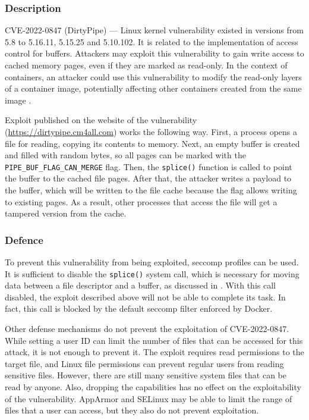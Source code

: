 \subsubsection*{Description}

CVE-2022-0847 (DirtyPipe) — Linux kernel vulnerability existed in versions from 5.8 to 5.16.11, 5.15.25 and 5.10.102. It is related to the implementation of access control for buffers. Attackers may exploit this vulnerability to gain write access to cached memory pages, even if they are marked as read-only. In the context of containers, an attacker could use this vulnerability to modify the read-only layers of a container image, potentially affecting other containers created from the same image \cite{s:h:2}.

Exploit published on the website of the vulnerability (\url{https://dirtypipe.cm4all.com}) works the following way. First, a process opens a file for reading, copying its contents to memory. Next, an empty buffer is created and filled with random bytes, so all pages can be marked with the \texttt{PIPE\_BUF\_FLAG\_CAN\_MERGE} flag. Then, the \texttt{splice()} function is called to point the buffer to the cached file pages. After that, the attacker writes a payload to the buffer, which will be written to the file cache because the flag allows writing to existing pages. As a result, other processes that access the file will get a tampered version from the cache. 

\subsubsection*{Defence}

To prevent this vulnerability from being exploited, seccomp profiles can be used. It is sufficient to disable the \texttt{splice()} system call, which is necessary for moving data between a file descriptor and a buffer, as discussed in \cite{s:h:4}. With this call disabled, the exploit described above will not be able to complete its task. In fact, this call is blocked by the default seccomp filter enforced by Docker.

Other defense mechanisms do not prevent the exploitation of CVE-2022-0847. While setting a user ID can limit the number of files that can be accessed for this attack, it is not enough to prevent it. The exploit requires read permissions to the target file, and Linux file permissions can prevent regular users from reading sensitive files. However, there are still many sensitive system files that can be read by anyone. Also, dropping the capabilities has no effect on the exploitability of the vulnerability. AppArmor and SELinux may be able to limit the range of files that a user can access, but they also do not prevent exploitation.


